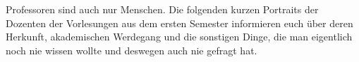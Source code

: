 
Professoren sind auch nur Menschen. Die folgenden kurzen Portraits der Dozenten der Vorlesungen aus dem ersten Semester informieren euch über deren Herkunft, akademischen Werdegang und die sonstigen Dinge, die man eigentlich noch nie wissen wollte und deswegen auch nie gefragt hat.

